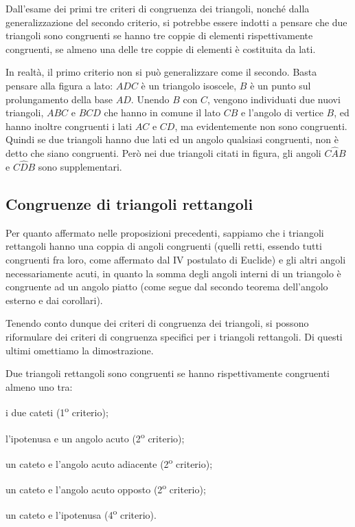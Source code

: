 \osservazione Dall'esame dei primi tre criteri di congruenza dei 
triangoli, nonché dalla generalizzazione del secondo criterio, si 
potrebbe essere indotti a pensare che due triangoli sono congruenti 
se hanno tre coppie di elementi rispettivamente congruenti, se almeno 
una delle tre coppie di elementi è costituita da lati.

\noindent \begin{minipage}{0.6\textwidth}
  In realtà, il primo criterio non si può generalizzare come il 
  secondo. Basta pensare alla figura a lato: $ADC$ è un triangolo 
  isoscele, $B$ è un punto sul prolungamento della base $AD$. Unendo $B$ 
  con $C$, vengono individuati due nuovi triangoli, $ABC$ e $BCD$ che 
  hanno in comune il lato $CB$ e l'angolo di vertice $B$, ed hanno 
  inoltre congruenti i lati $AC$ e $CD$, ma evidentemente non sono 
  congruenti. Quindi se due triangoli hanno due lati ed un angolo 
  qualsiasi congruenti, non è detto che siano congruenti. Però nei due 
  triangoli citati in figura, gli angoli $C\widehat{A}B$ e 
  $C\widehat{D}B$ sono supplementari.
\end{minipage}\hfil
\begin{minipage}{0.4\textwidth}
  \centering
\end{minipage}


\subsection{Congruenze di triangoli rettangoli}

Per quanto affermato nelle proposizioni precedenti, sappiamo che i 
triangoli rettangoli hanno una coppia di angoli congruenti (quelli 
retti, essendo tutti congruenti fra loro, come affermato dal IV 
postulato di Euclide) e gli altri angoli necessariamente acuti, in 
quanto la somma degli angoli interni di un triangolo è congruente ad 
un angolo piatto (come segue dal secondo teorema dell'angolo esterno 
e dai corollari).

Tenendo conto dunque dei criteri di congruenza dei triangoli, si 
possono riformulare dei criteri di congruenza specifici per i 
triangoli rettangoli. Di questi ultimi omettiamo la dimostrazione. 

\begin{teorema}
  Due triangoli rettangoli sono congruenti se hanno rispettivamente 
  congruenti almeno uno tra:
  \begin{itemize*}
    \item i due cateti (1\textsuperscript{o} criterio);
    \item l'ipotenusa e un angolo acuto (2\textsuperscript{o} criterio);
    \item un cateto e l'angolo acuto adiacente (2\textsuperscript{o} 
    criterio);
    \item un cateto e l'angolo acuto opposto (2\textsuperscript{o} 
    criterio);
    \item un cateto e l'ipotenusa (4\textsuperscript{o} criterio).
  \end{itemize*}
\end{teorema}

